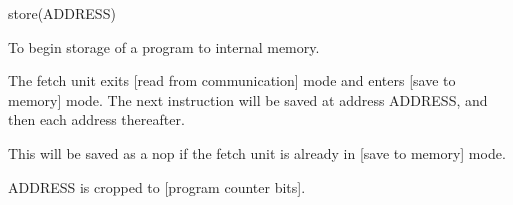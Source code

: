 

\format
store(ADDRESS)

\purpose

To begin storage of a program to internal memory.

\description

The fetch unit exits [read from communication] mode and enters [save to memory] mode.
The next instruction will be saved at address ADDRESS, and then each address thereafter.

\notes

This will be saved as a nop if the fetch unit is already in [save to memory] mode.

ADDRESS is cropped to [program counter bits].
